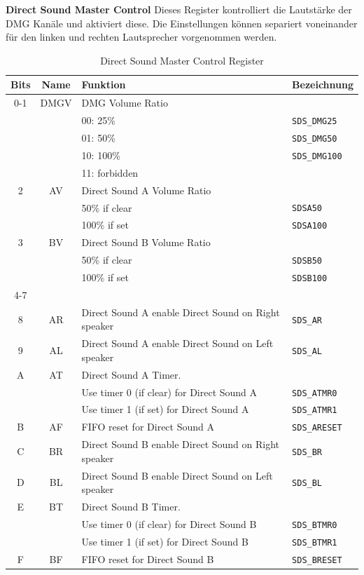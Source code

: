 \documentclass[11pt,a4paper]{scrartcl}
\newcommand{\paratitle}[1] {
    \vspace{5mm}
    \large \textbf{#1} \normalsize
    \vspace{2mm}\newline
}
\begin{document}
\newpage

\paratitle{Direct Sound Master Control} \label{directsoundmastercontrol}
Dieses Register kontrolliert die Lautst\"arke der DMG Kan\"ale und aktiviert diese. Die Einstellungen k\"onnen separiert voneinander f\"ur den linken und rechten Lautsprecher vorgenommen werden.

\begin{table}[h]
	\centering
    \begin{tabular}{ c | c | p{10cm} | l } 
	    \textbf{Bits} & \textbf{Name} & \textbf{Funktion} & \textbf{Bezeichnung} \\
	    \hline
	    0-1 & DMGV & DMG Volume Ratio & \\
	        &      & 00: 25\% & \verb|SDS_DMG25| \\
	        &      & 01: 50\% & \verb|SDS_DMG50| \\
	        &      & 10: 100\% & \verb|SDS_DMG100| \\
	        &      & 11: forbidden \\
	    \hline
	    2 & AV & Direct Sound A Volume Ratio & \\
	      &    & 50\% if clear & \verb|SDSA50| \\
	      &    & 100\% if set  & \verb|SDSA100| \\
        \hline
	    3 & BV & Direct Sound B Volume Ratio & \\
	      &    & 50\% if clear & \verb|SDSB50| \\
	      &    & 100\% if set  & \verb|SDSB100| \\
	    \hline
	    4-7 & & & \\
	    \hline
	    8 & AR & Direct Sound A enable Direct Sound on Right speaker & \verb|SDS_AR| \\
	    \hline
	    9 & AL & Direct Sound A enable Direct Sound on Left speaker & \verb|SDS_AL| \\
	    \hline
	    A & AT & Direct Sound A Timer. & \\
	       &   & Use timer 0 (if clear) for Direct Sound A & \verb|SDS_ATMR0| \\
	       &   & Use timer 1 (if set) for Direct Sound A & \verb|SDS_ATMR1| \\
	    \hline
	    B & AF & FIFO reset for Direct Sound A & \verb|SDS_ARESET| \\
	    \hline
	    C & BR & Direct Sound B enable Direct Sound on Right speaker & \verb|SDS_BR| \\
	    \hline
	    D & BL & Direct Sound B enable Direct Sound on Left speaker & \verb|SDS_BL| \\
	    \hline
	    E & BT & Direct Sound B Timer. & \\
	       &   & Use timer 0 (if clear) for Direct Sound B & \verb|SDS_BTMR0| \\
	       &   & Use timer 1 (if set) for Direct Sound B & \verb|SDS_BTMR1| \\
	    \hline
	    F & BF & FIFO reset for Direct Sound B & \verb|SDS_BRESET| \\
	\end{tabular}
	\caption{Direct Sound Master Control Register}
	\label{table:DirectSoundMasterControlRegister}
\end{table}
\end{document}
